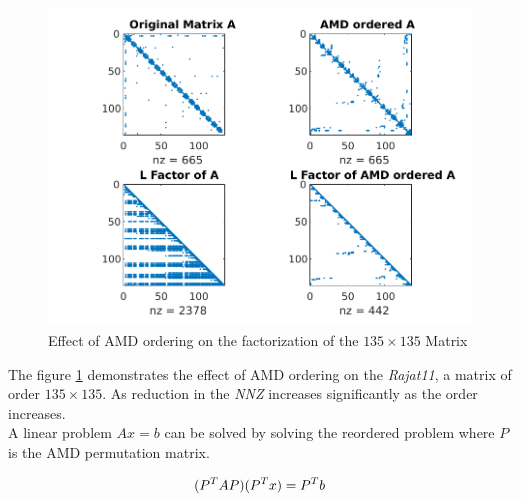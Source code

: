 \begin{figure}
    \centering
    \includegraphics[width = 0.9\linewidth]{./Theory/amd.pdf}
    \caption{Effect of AMD ordering on the factorization of the $135\times135$ Matrix}
    \label{fig:AMD:AMDeffect}
\end{figure}

The figure \ref{fig:AMD:AMDeffect} demonstrates the effect of AMD ordering on the 
\textit{Rajat11}, a matrix of order $135\times135$. As reduction in the \textit{NNZ} 
increases significantly as the order increases. \\
A linear problem $Ax = b$ can be solved by solving the reordered problem where $P$ is the 
AMD permutation matrix.

\begin{equation}
    \centering
    (P^TAP)(P^Tx) = P^Tb
    \label{eqn:AMD:ModifiedLinear}
\end{equation}